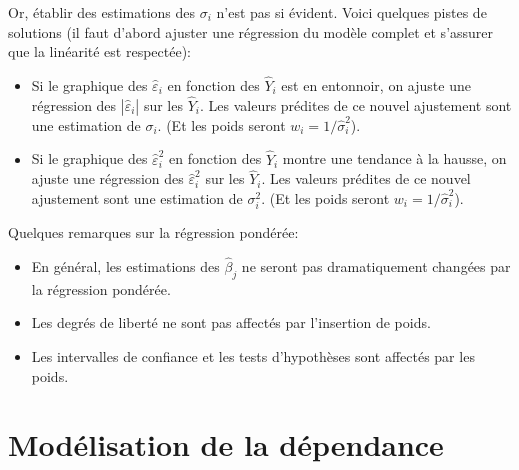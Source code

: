Or, établir des estimations des $\sigma_i$ n'est pas si évident.  Voici quelques pistes de solutions (il faut d'abord ajuster une régression du modèle complet et s'assurer que la linéarité est respectée):

\begin{itemize}
\item Si le graphique des $\hat\varepsilon_i$ en fonction des $\hat Y_i$ est en entonnoir, on ajuste une régression des $|\hat\varepsilon_i|$ sur les $\hat Y_i$. Les valeurs prédites de ce nouvel ajustement sont une estimation de $\sigma_i$. (Et les poids seront $w_i=1/\hat\sigma_i^2$).

\item Si le graphique des $\hat\varepsilon_i^2$ en fonction des $\hat Y_i$ montre une tendance à la hausse, on ajuste une régression des $\hat\varepsilon_i^2$ sur les $\hat Y_i$. Les valeurs prédites de ce nouvel ajustement sont une estimation de $\sigma_i^2$. (Et les poids seront $w_i=1/\hat\sigma_i^2$).
\end{itemize}


Quelques remarques sur la régression pondérée:
\begin{itemize}
\item En général, les estimations des $\hat\beta_j$ ne seront pas dramatiquement changées par la régression pondérée.
\item Les degrés de liberté ne sont pas affectés par l'insertion de poids. %
\item Les intervalles de confiance et les tests d'hypothèses sont affectés par les poids.
\end{itemize}

\newpage

\section{Modélisation de la dépendance}

